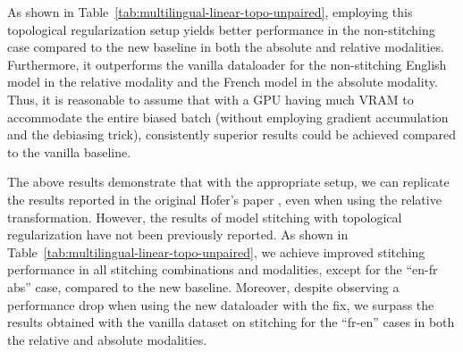 \documentclass[../main.tex]{subfiles}
\begin{document}
As shown in Table~\ref{tab:multilingual-linear-topo-unpaired}, employing this topological regularization setup yields better performance in the non-stitching case compared to the new baseline in both the absolute and relative modalities. Furthermore, it outperforms the vanilla dataloader for the non-stitching English model in the relative modality and the French model in the absolute modality. Thus, it is reasonable to assume that with a GPU having much VRAM to accommodate the entire biased batch (without employing gradient accumulation and the debiasing trick), consistently superior results could be achieved compared to the vanilla baseline.\\

\begin{table}[ht!]
\centering
{}
\caption{Topological regularization (over two random seeds)}
\label{tab:multilingual-linear-topo-unpaired}
\end{table}

The above results demonstrate that with the appropriate setup, we can replicate the results reported in the original Hofer's paper \cite{hofer_densified_2021}, even when using the relative transformation. However, the results of model stitching with topological regularization have not been previously reported. As shown in Table~\ref{tab:multilingual-linear-topo-unpaired}, we achieve improved stitching performance in all stitching combinations and modalities, except for the ``en-fr abs'' case, compared to the new baseline. Moreover, despite observing a performance drop when using the new dataloader with the fix, we surpass the results obtained with the vanilla dataset on stitching for the ``fr-en'' cases in both the relative and absolute modalities.\\
\end{document}
